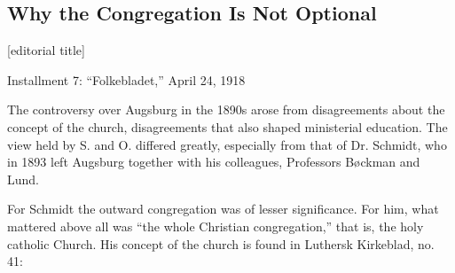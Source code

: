 



\subsection{Why the Congregation Is Not Optional}

[editorial title]

Installment 7: “Folkebladet,” April 24, 1918


The controversy over Augsburg in the 1890s arose from disagreements about the concept of the church, disagreements that also shaped ministerial education. The view held by S. and O. differed greatly, especially from that of Dr. Schmidt, who in 1893 left Augsburg together with his colleagues, Professors Bøckman and Lund.

For Schmidt the outward congregation was of lesser significance. For him, what mattered above all was “the whole Christian congregation,” that is, the holy catholic Church. His concept of the church is found in Luthersk Kirkeblad, no. 41:

